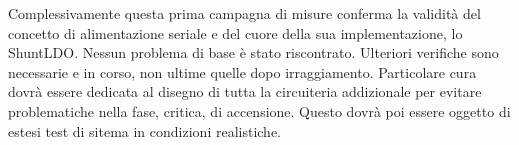 
Complessivamente questa prima campagna di misure conferma la validit\`a del concetto di alimentazione seriale e del cuore della sua implementazione, lo ShuntLDO. Nessun problema di base \`e stato riscontrato. Ulteriori verifiche sono necessarie e in corso, non ultime quelle dopo irraggiamento. Particolare cura dovr\`a essere dedicata al disegno di tutta la circuiteria addizionale per evitare problematiche nella fase, critica, di accensione. Questo dovr\`a poi essere oggetto di estesi test di sitema in condizioni realistiche.






